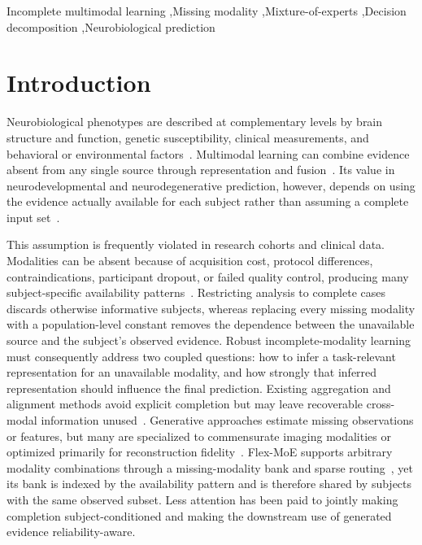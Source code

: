 \documentclass[a4paper,fleqn]{cas-dc}
\begin{document}
\begin{keywords}
Incomplete multimodal learning \sep Missing modality \sep Mixture-of-experts \sep Decision decomposition \sep Neurobiological prediction
\end{keywords}

\maketitle

\section{Introduction}
Neurobiological phenotypes are described at complementary levels by brain structure and function, genetic susceptibility, clinical measurements, and behavioral or environmental factors~\cite{ref_jack2018niaaa,ref_lane2018ad,ref_scheltens2021lancet}. Multimodal learning can combine evidence absent from any single source through representation and fusion~\cite{ref_zhang2011multimodal,ref_suk2014deep,ref_venugopalan2021,ref_liu2018survey,baltrusaitis2019multimodal,ngiam2011multimodal,ref_mag}. Its value in neurodevelopmental and neurodegenerative prediction, however, depends on using the evidence actually available for each subject rather than assuming a complete input set~\cite{ref_esteva2019guide}.

This assumption is frequently violated in research cohorts and clinical data. Modalities can be absent because of acquisition cost, protocol differences, contraindications, participant dropout, or failed quality control, producing many subject-specific availability patterns~\cite{ref_mlmm_survey,ref_wu2024mlmm,ref_hemis2016,ref_ma2021smil,ref_m3care}. Restricting analysis to complete cases discards otherwise informative subjects, whereas replacing every missing modality with a population-level constant removes the dependence between the unavailable source and the subject's observed evidence. Robust incomplete-modality learning must consequently address two coupled questions: how to infer a task-relevant representation for an unavailable modality, and how strongly that inferred representation should influence the final prediction. Existing aggregation and alignment methods avoid explicit completion but may leave recoverable cross-modal information unused~\cite{wang2023shaspec,lin2023missmodal}. Generative approaches estimate missing observations or features, but many are specialized to commensurate imaging modalities or optimized primarily for reconstruction fidelity~\cite{ref_wu2018mvae,ref_sutter2021gmelbo,dorent2019hved,li2025agdic,zhou2026acadiff}. Flex-MoE supports arbitrary modality combinations through a missing-modality bank and sparse routing~\cite{ref_flexmoe}, yet its bank is indexed by the availability pattern and is therefore shared by subjects with the same observed subset. Less attention has been paid to jointly making completion subject-conditioned and making the downstream use of generated evidence reliability-aware.
\end{document}
